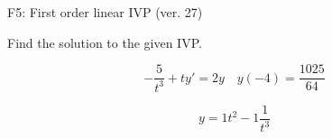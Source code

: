 \begin{exercise}
  \begin{exerciseTitle}F5: First order linear IVP (ver. 27)\end{exerciseTitle}
  \begin{exerciseStatement}
    
Find the solution to the given IVP.

    
\[-\frac{5}{t^{3}} +ty'= 2 y \hspace{1em} y( -4 ) = \frac{1025}{64}\]

  \end{exerciseStatement}
  \begin{exerciseAnswer}
    
\[y= 1 t^ 2 -1 \frac{1}{t^{3}}\]

  \end{exerciseAnswer}
\end{exercise}